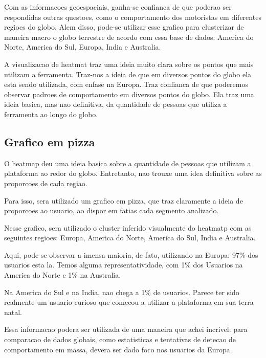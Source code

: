 \documentclass[10pt, conference]{IEEEtran}
\begin{document}
Com as informacoes geoespaciais, ganha-se confianca de que poderao ser respondidas outras questoes,
como o comportamento dos motoristas em diferentes regioes do globo. Alem disso, pode-se utilizar
esse grafico para clusterizar de maneira macro o globo terrestre de acordo com essa base de 
dados: America do Norte, America do Sul, Europa, India e Australia.

A visualizacao de heatmat traz uma ideia muito clara sobre os pontos que mais utilizam a 
ferramenta. Traz-nos a ideia de que em diversos pontos do globo ela esta sendo utilizada, com
enfase na Europa. Traz confianca de que poderemos observar padroes de comportamento em diversos
pontos do globo. Ela traz uma ideia basica, mas nao definitiva, da quantidade de pessoas
que utiliza a ferramenta ao longo do globo.




\subsection{Grafico em pizza}

O heatmap deu uma ideia basica sobre a quantidade de pessoas que utilizam a plataforma ao redor
do globo. Entretanto, nao trouxe uma idea definitiva sobre as proporcoes de cada regiao.

Para isso, sera utilizado um grafico em pizza, que traz claramente a ideia de proporcoes ao
usuario, ao dispor em fatias cada segmento analizado.

Nesse grafico, sera utilizado o cluster inferido visualmente do heatmatp com as seguintes
regioes: Europa, America do Norte, America do Sul, India e Australia.

Aqui, pode-se observar a imensa maioria, de fato, utilizando na Europa: 97\% dos usuarios
esta la. Temos alguma representatividade, com 1\% dos Usuarios na America do Norte e 1\% 
na Australia.

Na America do Sul e na India, nao chega a 1\% de usuarios. Parece ter sido realmente um usuario
curioso que comecou a utilizar a plataforma em sua terra natal.

Essa informacao podera ser utilizada de uma maneira que achei incrivel: para comparacao de
dados globais, como estatisticas e tentativas de detecao de comportamento em massa, devera
ser dado foco nos usuarios da Europa.
\end{document}
